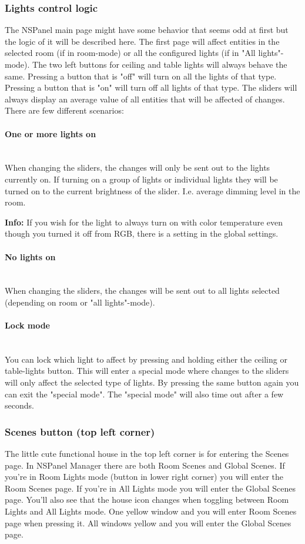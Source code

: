 \documentclass[10pt]{article}
\newcommand{\info}[1]{\begin{infoBox} \textbf{Info:} #1 \end{infoBox}}
\begin{document}
   	\subsubsection{Lights control logic}
    The NSPanel main page might have some behavior that seems odd at first but the logic of it will be described here. The first page will affect entities in the selected room (if in room-mode) or all the configured lights (if in "All lights"-mode). The two left buttons for ceiling and table lights will always behave the same. Pressing a button that is "off" will turn on all the lights of that type. Pressing a button that is "on" will turn off all lights of that type. The sliders will always display an average value of all entities that will be affected of changes. There are few different scenarios:				

    \paragraph{One or more lights on}\mbox{} \\
    When changing the sliders, the changes will only be sent out to the lights currently on.
    If turning on a group of lights or individual lights they will be turned on to the current brightness of the slider. I.e. average dimming level in the room.
    \info{If you wish for the light to always turn on with color temperature even though you turned it off from RGB, there is a setting in the global settings.}
    
    \paragraph{No lights on}\mbox{} \\
    When changing the sliders, the changes will be sent out to all lights selected (depending on room or "all lights"-mode).
    
    \paragraph{Lock mode}\mbox{} \\
    You can lock which light to affect by pressing and holding either the ceiling or table-lights button. This will enter a special mode where changes to the sliders will only affect the selected type of lights. By pressing the same button again you can exit the "special mode". The "special mode" will also time out after a few seconds.
    
    \subsubsection{Scenes button (top left corner)}
    The little cute functional house in the top left corner is for entering the Scenes page. In NSPanel Manager there are both Room Scenes and Global Scenes. If you're in Room Lights mode (button in lower right corner) you will enter the Room Scenes page. If you're in All Lights mode you will enter the Global Scenes page. You'll also see that the house icon changes when toggling between Room Lights and All Lights mode. One yellow window and you will enter Room Scenes page when pressing it. All windows yellow and you will enter the Global Scenes page.
\end{document}

